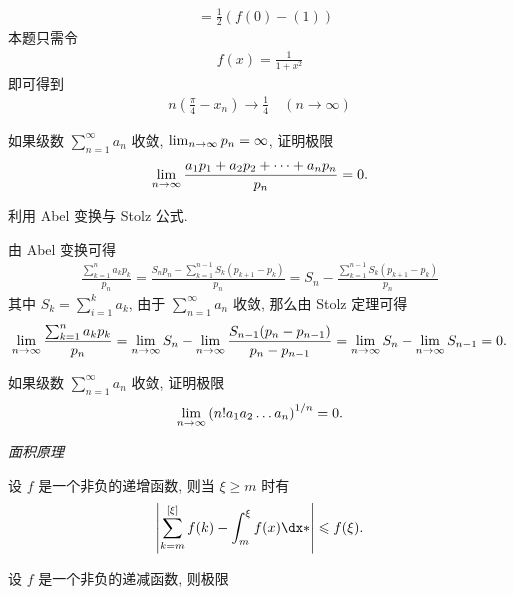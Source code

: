 \begin{exercise}[series=exer]
\begin{answer}
\begin{align*}
    &=\frac{1}{2}(f(0)-(1))
  \end{align*}
  本题只需令
  \begin{align*}
    f(x)=\frac{1}{1+x^{2}}
  \end{align*}
  即可得到
  \begin{align*}
    n\left(\frac{\pi}{4}-x_{n}\right) \to \frac{1}{4} \quad(n \to \infty)
  \end{align*}
  \end{answer}
  \item 如果级数 $ \sum_{n = 1}^{\infty} a_{n} $ 收敛, $ \lim_{n \to \infty} p_{n} = \infty $, 证明极限
  \begin{align*}
      \lim_{n \to \infty}\frac{a_{1} p_{1} + a_{2} p_{2} + \dots + a_{n} p_{n}}{p_{n}} = 0.
  \end{align*}
  \begin{hint}
      利用 Abel 变换与 Stolz 公式.
  \end{hint}
  \begin{answer}
      由 Abel 变换可得
      \begin{align*}
          \frac{\sum_{k = 1}^{n} a_{k}p_{k}}{p_{n}} = \frac{S_{n}p_{n} - \sum_{k = 1}^{n - 1}S_{k}(p_{k + 1} - p_{k})}{p_{n}} = S_{n} - \frac{\sum_{k = 1}^{n - 1}S_{k}(p_{k + 1} - p_{k})}{p_{n}}
      \end{align*}
      其中 $ S_{k} = \sum_{i = 1}^{k}a_{k} $, 由于 $ \sum_{n = 1}^{\infty}a_{n} $ 收敛, 那么由 Stolz 定理可得
      \begin{align*}
          \lim_{n \to \infty}\frac{\sum_{k = 1}^{n} a_{k}p_{k}}{p_{n}} = \lim_{n \to \infty}S_{n} - \lim_{n \to \infty}\frac{S_{n - 1}(p_{n} - p_{n - 1})}{p_{n} - p_{n - 1}} = \lim_{n \to \infty}S_{n} - \lim_{n \to \infty}S_{n - 1} = 0.
      \end{align*}
  \end{answer}
  \item 如果级数 $ \sum_{n = 1}^{\infty} a_{n} $ 收敛, 证明极限
  \begin{align*}
      \lim_{n \to \infty}\qty(n! a_{1} a_{2} \dots a_{n})^{1/n} = 0.
  \end{align*}
  \item \emph{面积原理}
  \begin{exercise}
      \item 设 $ f $ 是一个非负的递增函数, 则当 $ \xi \ge m $ 时有
      \begin{align*}
          \abs{\sum_{k = m}^{[\xi]} f(k) - \int_{m}^{\xi} f(x) \dx*} \le f(\xi).
      \end{align*}
      \item 设 $ f $ 是一个非负的递减函数, 则极限

\end{exercise}
\end{exercise}
